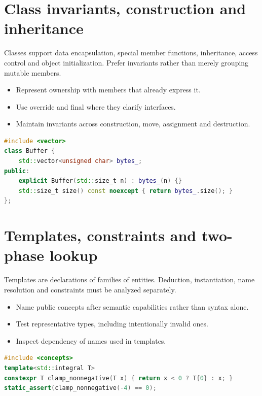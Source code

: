 \documentclass[11pt]{article}
\begin{document}
\section{Class invariants, construction and inheritance}
Classes support data encapsulation, special member functions, inheritance, access control and object initialization. Prefer invariants rather than merely grouping mutable members.

\begin{itemize}[leftmargin=*,itemsep=1pt,topsep=3pt]
\item Represent ownership with members that already express it.
\item Use override and final where they clarify interfaces.
\item Maintain invariants across construction, move, assignment and destruction.
\end{itemize}
\begin{lstlisting}[language=C++]
#include <vector>
class Buffer {
    std::vector<unsigned char> bytes_;
public:
    explicit Buffer(std::size_t n) : bytes_(n) {}
    std::size_t size() const noexcept { return bytes_.size(); }
};
\end{lstlisting}
\section{Templates, constraints and two-phase lookup}
Templates are declarations of families of entities. Deduction, instantiation, name resolution and constraints must be analyzed separately.

\begin{itemize}[leftmargin=*,itemsep=1pt,topsep=3pt]
\item Name public concepts after semantic capabilities rather than syntax alone.
\item Test representative types, including intentionally invalid ones.
\item Inspect dependency of names used in templates.
\end{itemize}
\begin{lstlisting}[language=C++]
#include <concepts>
template<std::integral T>
constexpr T clamp_nonnegative(T x) { return x < 0 ? T{0} : x; }
static_assert(clamp_nonnegative(-4) == 0);
\end{lstlisting}
\end{document}
